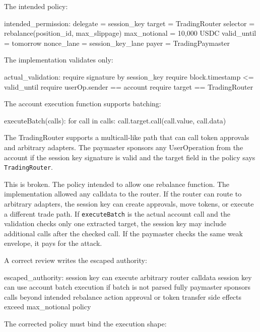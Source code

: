 The intended policy:

\begin{codeblock}
intended_permission:
    delegate = session_key
    target = TradingRouter
    selector = rebalance(position_id, max_slippage)
    max_notional = 10,000 USDC
    valid_until = tomorrow
    nonce_lane = session_key_lane
    payer = TradingPaymaster
\end{codeblock}

The implementation validates only:

\begin{codeblock}
actual_validation:
    require signature by session_key
    require block.timestamp <= valid_until
    require userOp.sender == account
    require target == TradingRouter
\end{codeblock}

The account execution function supports batching:

\begin{codeblock}
executeBatch(calls):
    for call in calls:
        call.target.call(call.value, call.data)
\end{codeblock}

The TradingRouter supports a multicall-like path that can call token approvals and arbitrary adapters. The paymaster sponsors any UserOperation from the account if the session key signature is valid and the target field in the policy says \texttt{TradingRouter}.

This is broken. The policy intended to allow one rebalance function. The implementation allowed any calldata to the router. If the router can route to arbitrary adapters, the session key can create approvals, move tokens, or execute a different trade path. If \texttt{executeBatch} is the actual account call and the validation checks only one extracted target, the session key may include additional calls after the checked call. If the paymaster checks the same weak envelope, it pays for the attack.

A correct review writes the escaped authority:

\begin{codeblock}
escaped_authority:
    session key can execute arbitrary router calldata
    session key can use account batch execution if batch is not parsed fully
    paymaster sponsors calls beyond intended rebalance action
    approval or token transfer side effects exceed max_notional policy
\end{codeblock}

The corrected policy must bind the execution shape:


